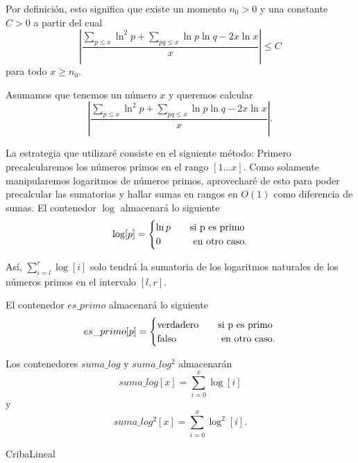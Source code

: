 \documentclass{article}
\theoremstyle{definition}
\theoremstyle{remark}
\begin{document}
Por definici\'on, esto significa que existe un momento $n_0 > 0$ y una constante $C > 0$ a partir del cual
$$\left|\frac{\sum_{p \leq x} \ln^2 p + \sum_{pq \leq x} \ln p \ln q - 2x\ln x}{x}\right| \leq C$$
para todo $x \geq n_0$.

Asumamos que tenemos un n\'umero $x$ y queremos calcular
$$\left|\frac{\sum_{p \leq x} \ln^2 p + \sum_{pq \leq x} \ln p \ln q - 2x\ln x}{x}\right|.$$

La estrategia que utilizar\'e consiste en el siguiente m\'etodo:
Primero precalcularemos los n\'umeros primos en el rango $[1 \dots x]$.
Como solamente manipularemos logaritmos de n\'umeros primos, aprovechar\'e de esto para poder precalcular
las sumatorias y hallar sumas en rangos en $O(1)$ como diferencia de sumas.
El contenedor $\log$ almacenar\'a lo siguiente
\[
\log[p] =
\begin{cases}
\ln p &\quad\text{si }$p$\text{ es primo}\\
0 &\quad\text{ en otro caso.}
\end{cases}
\]

As\'i, $\sum_{i = l}^r \log[i]$ solo tendr\'a la sumatoria de
los logaritmos naturales de los n\'umeros primos en el intervalo $[l, r]$.

El contenedor $es\_primo$ almacenar\'a lo siguiente
\[
es\_primo[p] =
\begin{cases}
\text{verdadero} &\quad\text{si }$p$\text{ es primo}\\
\text{falso} &\quad\text{ en otro caso.}
\end{cases}
\]

Los contenedores $suma\_log$ y $suma\_log^2$ almacenar\'an
$$suma\_log[x] = \sum_{i = 0}^x \log[i]$$
y
$$suma\_log^2[x] = \sum_{i = 0}^x \log^2[i].$$

\begin{algorithm}[H]
\SetAlgoLined
\DontPrintSemicolon
{}
\caption{CribaLineal\label{CL}}
\end{algorithm}
\end{document}

